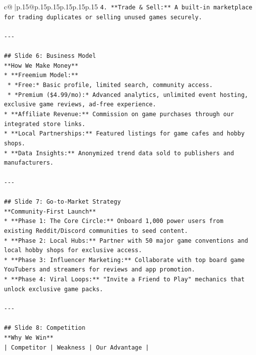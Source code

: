 \documentclass{article}
\begin{document}
{\begin{supertabular}{c@{$\;$}|p{.15\linewidth}@{}p{.15\linewidth}p{.15\linewidth}p{.15\linewidth}p{.15\linewidth}p{.15\linewidth}}
{{{\texttt{4.  **Trade \& Sell:** A built{-}in marketplace for trading duplicates or selling unused games securely.} \\
\\ 
\texttt{{-}{-}{-}} \\
\\ 
\texttt{\#\# Slide 6: Business Model} \\
\texttt{**How We Make Money**} \\
\texttt{*   **Freemium Model:**} \\
\texttt{    *   *Free:* Basic profile, limited search, community access.} \\
\texttt{    *   *Premium (\$4.99/mo):* Advanced analytics, unlimited event hosting, exclusive game reviews, ad{-}free experience.} \\
\texttt{*   **Affiliate Revenue:** Commission on game purchases through our integrated store links.} \\
\texttt{*   **Local Partnerships:** Featured listings for game cafes and hobby shops.} \\
\texttt{*   **Data Insights:** Anonymized trend data sold to publishers and manufacturers.} \\
\\ 
\texttt{{-}{-}{-}} \\
\\ 
\texttt{\#\# Slide 7: Go{-}to{-}Market Strategy} \\
\texttt{**Community{-}First Launch**} \\
\texttt{*   **Phase 1: The Core Circle:** Onboard 1,000 power users from existing Reddit/Discord communities to seed content.} \\
\texttt{*   **Phase 2: Local Hubs:** Partner with 50 major game conventions and local hobby shops for exclusive access.} \\
\texttt{*   **Phase 3: Influencer Marketing:** Collaborate with top board game YouTubers and streamers for reviews and app promotion.} \\
\texttt{*   **Phase 4: Viral Loops:** "Invite a Friend to Play" mechanics that unlock exclusive game packs.} \\
\\ 
\texttt{{-}{-}{-}} \\
\\ 
\texttt{\#\# Slide 8: Competition} \\
\texttt{**Why We Win**} \\
\texttt{| Competitor | Weakness | Our Advantage |} \\
}}}
\end{supertabular}}
\end{document}

